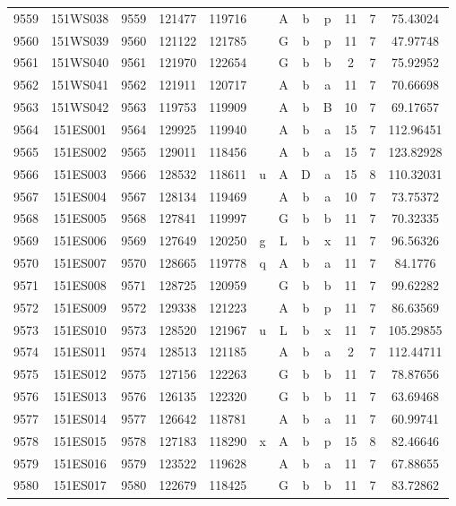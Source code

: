 \begin{tabular}{|*{12}{c|}}
9559 & 151WS038 & 9559 & 121477 & 119716 &  & A & b & p & 11 & 7 & 75.43024 \\ 
9560 & 151WS039 & 9560 & 121122 & 121785 &  & G & b & p & 11 & 7 & 47.97748 \\ 
9561 & 151WS040 & 9561 & 121970 & 122654 &  & G & b & b & 2 & 7 & 75.92952 \\ 
9562 & 151WS041 & 9562 & 121911 & 120717 &  & A & b & a & 11 & 7 & 70.66698 \\ 
9563 & 151WS042 & 9563 & 119753 & 119909 &  & A & b & B & 10 & 7 & 69.17657 \\ 
9564 & 151ES001 & 9564 & 129925 & 119940 &  & A & b & a & 15 & 7 & 112.96451 \\ 
9565 & 151ES002 & 9565 & 129011 & 118456 &  & A & b & a & 15 & 7 & 123.82928 \\ 
9566 & 151ES003 & 9566 & 128532 & 118611 & u & A & D & a & 15 & 8 & 110.32031 \\ 
9567 & 151ES004 & 9567 & 128134 & 119469 &  & A & b & a & 10 & 7 & 73.75372 \\ 
9568 & 151ES005 & 9568 & 127841 & 119997 &  & G & b & b & 11 & 7 & 70.32335 \\ 
9569 & 151ES006 & 9569 & 127649 & 120250 & g & L & b & x & 11 & 7 & 96.56326 \\ 
9570 & 151ES007 & 9570 & 128665 & 119778 & q & A & b & a & 11 & 7 & 84.1776 \\ 
9571 & 151ES008 & 9571 & 128725 & 120959 &  & G & b & b & 11 & 7 & 99.62282 \\ 
9572 & 151ES009 & 9572 & 129338 & 121223 &  & A & b & p & 11 & 7 & 86.63569 \\ 
9573 & 151ES010 & 9573 & 128520 & 121967 & u & L & b & x & 11 & 7 & 105.29855 \\ 
9574 & 151ES011 & 9574 & 128513 & 121185 &  & A & b & a & 2 & 7 & 112.44711 \\ 
9575 & 151ES012 & 9575 & 127156 & 122263 &  & G & b & b & 11 & 7 & 78.87656 \\ 
9576 & 151ES013 & 9576 & 126135 & 122320 &  & G & b & b & 11 & 7 & 63.69468 \\ 
9577 & 151ES014 & 9577 & 126642 & 118781 &  & A & b & a & 11 & 7 & 60.99741 \\ 
9578 & 151ES015 & 9578 & 127183 & 118290 & x & A & b & p & 15 & 8 & 82.46646 \\ 
9579 & 151ES016 & 9579 & 123522 & 119628 &  & A & b & a & 11 & 7 & 67.88655 \\ 
9580 & 151ES017 & 9580 & 122679 & 118425 &  & G & b & b & 11 & 7 & 83.72862 \\ 

\end{tabular}
